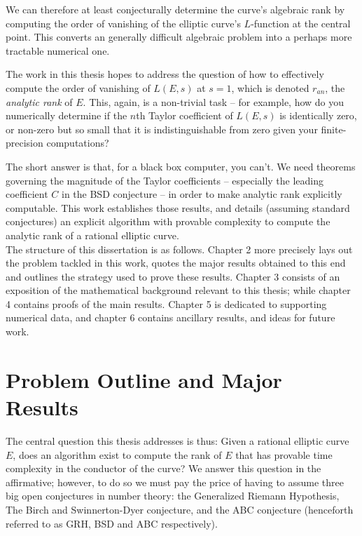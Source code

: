 \documentclass[10pt]{article}
\begin{document}
We can therefore at least conjecturally determine the curve's algebraic rank by computing the order of vanishing of the elliptic curve's $L$-function at the central point. This converts an generally difficult algebraic problem into a perhaps more tractable numerical one.

The work in this thesis hopes to address the question of how to effectively compute the order of vanishing of $L(E,s)$ at $s=1$, which is denoted $r_{an}$, the {\it analytic rank} of $E$. This, again, is a non-trivial task -- for example, how do you numerically determine if the $n$th Taylor coefficient of $L(E,s)$ is identically zero, or non-zero but so small that it is indistinguishable from zero given your finite-precision computations?

The short answer is that, for a black box computer, you can't. We need theorems governing the magnitude of the Taylor coefficients -- especially the leading coefficient $C$ in the BSD conjecture -- in order to make analytic rank explicitly computable. This work establishes those results, and details (assuming standard conjectures) an explicit algorithm with provable complexity to compute the analytic rank of a rational elliptic curve. \\

The structure of this dissertation is as follows. Chapter 2 more precisely lays out the problem tackled in this work, quotes the major results obtained to this end and outlines the strategy used to prove these results. Chapter 3 consists of an exposition of the mathematical background relevant to this thesis; while chapter 4 contains proofs of the main results. Chapter 5 is dedicated to supporting numerical data, and chapter 6 contains ancillary results, and ideas for future work.

\newpage
\section{Problem Outline and Major Results}\label{sec:outline_results}

The central question this thesis addresses is thus: Given a rational elliptic curve $E$, does an algorithm exist to compute the rank of $E$ that has provable time complexity in the conductor of the curve? We answer this question in the affirmative; however, to do so we must pay the price of having to assume three big open conjectures in number theory: the Generalized Riemann Hypothesis, The Birch and Swinnerton-Dyer conjecture, and the ABC conjecture (henceforth referred to as GRH, BSD and ABC respectively). \\
\end{document}
